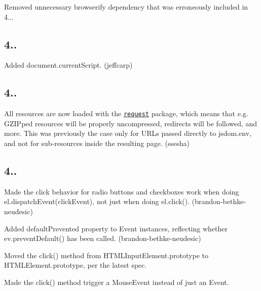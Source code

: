 \begin{DoxyItemize}
\item Removed unnecessary browserify dependency that was erroneously included in 4...
\end{DoxyItemize}

\subsection*{4..}


\begin{DoxyItemize}
\item Added {\ttfamily document.\+current\+Script}. (jeffcarp)
\end{DoxyItemize}

\subsection*{4..}


\begin{DoxyItemize}
\item All resources are now loaded with the \href{https://www.npmjs.com/package/request}{\tt request} package, which means that e.\+g. G\+Z\+I\+Pped resources will be properly uncompressed, redirects will be followed, and more. This was previously the case only for U\+R\+Ls passed directly to {\ttfamily jsdom.\+env}, and not for sub-\/resources inside the resulting page. (ssesha)
\end{DoxyItemize}

\subsection*{4..}


\begin{DoxyItemize}
\item Made the click behavior for radio buttons and checkboxes work when doing {\ttfamily el.\+dispatch\+Event(click\+Event)}, not just when doing {\ttfamily el.\+click()}. (brandon-\/bethke-\/neudesic)
\item Added {\ttfamily default\+Prevented} property to {\ttfamily Event} instances, reflecting whether {\ttfamily ev.\+prevent\+Default()} has been called. (brandon-\/bethke-\/neudesic)
\item Moved the {\ttfamily click()} method from {\ttfamily H\+T\+M\+L\+Input\+Element.\+prototype} to {\ttfamily H\+T\+M\+L\+Element.\+prototype}, per the latest spec.
\item Made the {\ttfamily click()} method trigger a {\ttfamily Mouse\+Event} instead of just an {\ttfamily Event}.
\end{DoxyItemize}

